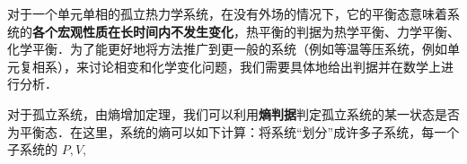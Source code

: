 
对于一个单元单相的孤立热力学系统，在没有外场的情况下，它的平衡态意味着系统的\textbf{各个宏观性质在长时间内不发生变化}，热平衡的判据为热学平衡、力学平衡、化学平衡．为了能更好地将方法推广到更一般的系统（例如等温等压系统，例如单元复相系），来讨论相变和化学变化问题，我们需要具体地给出判据并在数学上进行分析．

对于孤立系统，由熵增加定理，我们可以利用\textbf{熵判据}判定孤立系统的某一状态是否为平衡态．在这里，系统的熵可以如下计算：将系统“划分”成许多子系统，每一个子系统的 $P,V,$